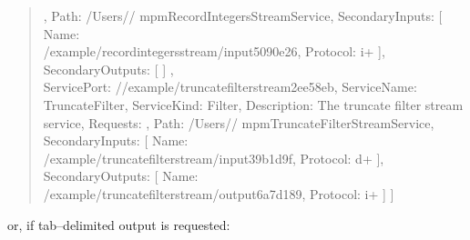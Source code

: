 \begin{quote}
\dquote{}\dquote{}, \dquote{}Path\dquote{}: \dquote{}/Users/\textellipsis{}/%
mpmRecordIntegersStreamService\dquote{}, \dquote{}SecondaryInputs\dquote{}: [
\textbraceleft{} \dquote{}Name\dquote{}:\\
\dquote{}/example/recordintegersstream/input\textunderscore{}5090e26\dquote{},
\dquote{}Protocol\dquote{}: \dquote{}i+\dquote{}
\textbraceright{} ], \dquote{}SecondaryOutputs\dquote{}: [  ] \textbraceright{},\\
\textbraceleft{} \dquote{}ServicePort\dquote{}:
\dquote{}/\serviceName/example/truncatefilterstream\textunderscore{}2ee58eb\dquote{},
\dquote{}ServiceName\dquote{}: \dquote{}TruncateFilter\dquote{},
\dquote{}ServiceKind\dquote{}: \dquote{}Filter\dquote{}, \dquote{}Description\dquote{}:
\dquote{}The truncate filter stream service\dquote{}, \dquote{}Requests\dquote{}:
\dquote{}\dquote{}, \dquote{}Path\dquote{}: \dquote{}/Users/\textellipsis{}/%
mpmTruncateFilterStreamService\dquote{}, \dquote{}SecondaryInputs\dquote{}: [
\textbraceleft{} \dquote{}Name\dquote{}:\\
\dquote{}/example/truncatefilterstream/input\textunderscore{}39b1d9f\dquote{},
\dquote{}Protocol\dquote{}: \dquote{}d+\dquote{} \textbraceright{} ],
\dquote{}SecondaryOutputs\dquote{}: [ \textbraceleft{} \dquote{}Name\dquote{}:\\
\dquote{}/example/truncatefilterstream/output\textunderscore{}6a7d189\dquote{},
\dquote{}Protocol\dquote{}: \dquote{}i+\dquote{} \textbraceright{} ] \textbraceright{} ]
\end{quote}
or, if tab--delimited output is requested:

